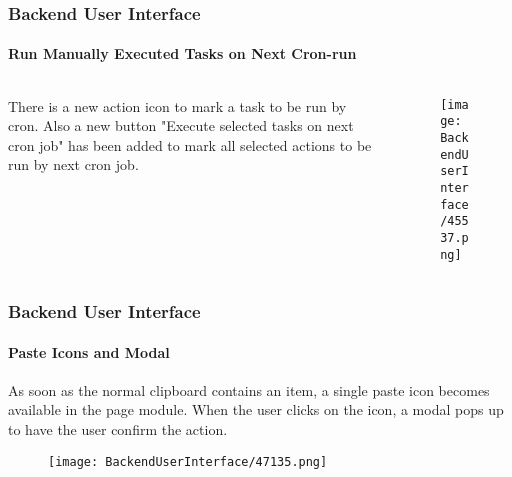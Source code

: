 \begin{frame}[fragile]
	\frametitle{Backend User Interface}
	\framesubtitle{Run Manually Executed Tasks on Next Cron-run}

	\begin{columns}[T]
		\begin{column}{0.3\textwidth}
			There is a new action icon to mark a task to be run by cron. Also a new button
			"Execute selected tasks on next cron job" has been added to mark all selected actions
			to be run by next cron job.
		\end{column}

		\begin{column}{0.7\textwidth}
			\begin{figure}\vspace{-0.6cm}
				\texttt{[image: BackendUserInterface/45537.png]}
			\end{figure}
		\end{column}
	\end{columns}

\end{frame}

\begin{frame}[fragile]
	\frametitle{Backend User Interface}
	\framesubtitle{Paste Icons and Modal}

	As soon as the normal clipboard contains an item, a single paste icon becomes available
	in the page module. When the user clicks on the icon, a modal pops up to have the user
	confirm the action.

	\begin{figure}\vspace{-0.2cm}
		\texttt{[image: BackendUserInterface/47135.png]}
	\end{figure}

\end{frame}


